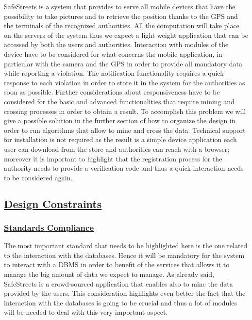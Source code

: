 		SafeStreets is a system that provides to serve all mobile devices that have the possibility to take pictures and to retrieve the position thanks to the GPS and the terminals of the recognized authorities. All the computation will take place on the servers of the system thus we expect a light weight application that can be accessed by both the users and authorities. Interaction with modules of the device have to be considered for what concerns the mobile application, in particular with the camera and the GPS in order to provide all mandatory data while reporting a violation. The notification functionality requires a quick response to each violation in order to store it in the system for the authorities as soon as possible. Further considerations about responsiveness have to be considered for the basic and advanced functionalities that require mining and crossing processes in order to obtain a result. To accomplish this problem we will give a possible solution in the further section of how to organize the design in order to run algorithms that allow to mine and cross the data. Technical support for installation is not required as the result is a simple device application each user can download from the store and authorities can reach with a browser; moreover it is important to highlight that the registration process for the authority needs to provide a verification code and thus a quick interaction needs to be considered again.
	
	\subsection[Design Constraints]{\hyperlink{toc}{Design Constraints}}
		\subsubsection[Standards Compliance]{\hyperlink{toc}{Standards Compliance}}
			\label{sec:standardCompliance}
			The most important standard that needs to be highlighted here is the one related to the interaction with the databases. Hence it will be mandatory for the system to interact with a DBMS in order to benefit of the services that allows it to manage the big amount of data we expect to manage. As already said, SafeStreets is a crowd-sourced application that enables also to mine the data provided by the users. This consideration highlights even better the fact that the interaction with the databases is going to be crucial and thus a lot of modules will be needed to deal with this very important aspect.
